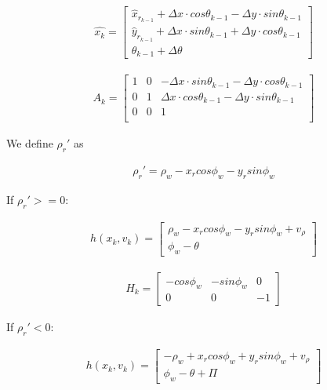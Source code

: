 \documentclass[journal]{IEEEtran}
\begin{document}
\begin{align}\label{f}
\hat{x_k} = 
\begin{bmatrix}
\hat{x}_{r_{k-1}} + \Delta x \cdot cos \theta_{k-1} - \Delta y \cdot sin \theta_{k-1} \\
\hat{y}_{r_{k-1}} + \Delta x \cdot sin \theta_{k-1} + \Delta y \cdot cos \theta_{k-1} \\
\theta_{k-1} + \Delta \theta
\end{bmatrix}
\end{align}



\begin{align}\label{A}
A_k = 
\begin{bmatrix}
1 & 0 & -\Delta x\cdot sin \theta_{k-1} - \Delta y \cdot cos \theta_{k-1} \\
0 & 1 & \Delta x\cdot cos \theta_{k-1} - \Delta y \cdot sin \theta_{k-1} \\
0 & 0 & 1 \\
\end{bmatrix}
\end{align}

We define $\rho_r '$ as 

\begin{align}\label{rho}
\rho_r ' = \rho_w - x_r cos\phi_w - y_r sin \phi_w
\end{align}

If $\rho_r ' >= 0$:

\begin{align}\label{h1}
h(x_k,v_k) = 
\begin{bmatrix}
\rho_w - x_r cos\phi_w - y_r sin \phi_w + v_\rho \\
\phi_w - \theta
\end{bmatrix}
\end{align}

\begin{align}\label{H1}
H_k = 
\begin{bmatrix}
-cos\phi_w & -sin \phi_w & 0 \\
0 & 0 & -1
\end{bmatrix}
\end{align}

If $\rho_r ' < 0$:

\begin{align}\label{h2}
h(x_k,v_k) = 
\begin{bmatrix}
-\rho_w + x_r cos\phi_w + y_r sin \phi_w + v_\rho \\
\phi_w - \theta + \Pi
\end{bmatrix}
\end{align}
\end{document}
